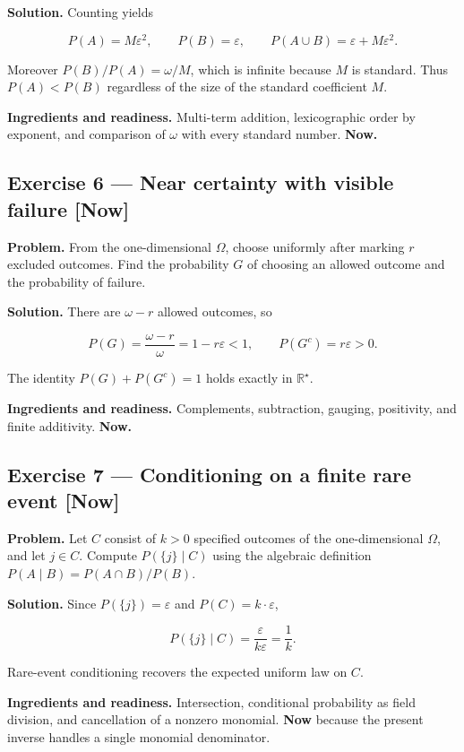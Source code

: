 \documentclass[11pt]{article}
\newcommand{\Rstar}{\mathbb{R}^{\star}}
\newcommand{\eps}{\varepsilon}
\renewcommand{\epsilon}{\varepsilon}
\begin{document}
\textbf{Solution.} Counting yields

\[
P(A)=M\epsilon^2,
\qquad P(B)=\epsilon,
\qquad P(A\cup B)=\epsilon+M\epsilon^2.
\]

Moreover $P(B)/P(A) = \omega/M$, which is infinite because $M$ is standard.
Thus $P(A) < P(B)$ regardless of the size of the standard coefficient $M$.

\textbf{Ingredients and readiness.} Multi-term addition, lexicographic order by
exponent, and comparison of $\omega$ with every standard number. \textbf{Now.}


\subsection*{Exercise 6 --- Near certainty with visible failure \hfill \normalfont\small[Now]}

\textbf{Problem.} From the one-dimensional $\Omega$, choose uniformly after marking
$r$ excluded outcomes. Find the probability $G$ of choosing an allowed
outcome and the probability of failure.

\textbf{Solution.} There are $\omega-r$ allowed outcomes, so

\[
P(G)=\frac{\omega-r}{\omega}=1-r\epsilon<1,
\qquad P(G^c)=r\epsilon>0.
\]

The identity $P(G)+P(G^c)=1$ holds exactly in $\Rstar$.

\textbf{Ingredients and readiness.} Complements, subtraction, gauging, positivity,
and finite additivity. \textbf{Now.}


\subsection*{Exercise 7 --- Conditioning on a finite rare event \hfill \normalfont\small[Now]}

\textbf{Problem.} Let $C$ consist of $k > 0$ specified outcomes of the
one-dimensional $\Omega$, and let $j\in C$. Compute $P(\{j\}\mid C)$ using the
algebraic definition $P(A\mid B) = P(A\cap B)/P(B)$.

\textbf{Solution.} Since $P(\{j\}) = \eps$ and $P(C) = k\cdot \eps$,

\[
P(\{j\}\mid C)=\frac{\epsilon}{k\epsilon}=\frac1k.
\]

Rare-event conditioning recovers the expected uniform law on $C$.

\textbf{Ingredients and readiness.} Intersection, conditional probability as field
division, and cancellation of a nonzero monomial. \textbf{Now} because the present
inverse handles a single monomial denominator.
\end{document}
